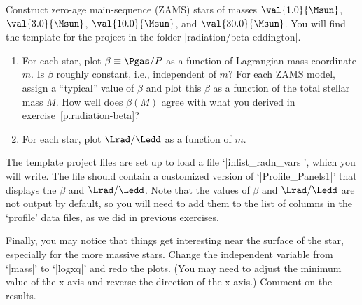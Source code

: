
\DefineShortVerb{\|}

\begin{mesaproject}
\label{m.beta-Eddington}

Construct zero-age main-sequence (ZAMS) stars of masses $\val{1.0}{\Msun}$, $\val{3.0}{\Msun}$, $\val{10.0}{\Msun}$, and $\val{30.0}{\Msun}$. You will find the template for the project in  the folder |radiation/beta-eddington|. 

\begin{enumerate}
\item For each star, plot $\beta\equiv \Pgas/P$ as a function of Lagrangian mass coordinate $m$. Is $\beta$ roughly constant, i.e., independent of $m$? For each ZAMS model, assign a ``typical'' value of $\beta$ and plot this $\beta$ as a function of the total stellar mass $M$.  How well does $\beta(M)$ agree with what you derived in exercise~\ref{p.radiation-beta}?

\item For each star, plot $\Lrad/\Ledd$ as a function of $m$.
\end{enumerate}
The template project files are set up to load a file `|inlist_radn_vars|', which you will write.  The file should contain a customized version of `|Profile_Panels1|' that displays the $\beta$ and $\Lrad/\Ledd$. Note that the values of $\beta$ and $\Lrad/\Ledd$ are not output by default, so you will need to add them to the list of columns in the `profile' data files, as we did in previous exercises.

Finally, you may notice that things get interesting near the surface of the star, especially for the more massive stars.  Change the independent variable from `|mass|' to `|logxq|' and redo the plots. (You may need to adjust the minimum value of the x-axis and reverse the direction of the x-axis.) Comment on the results.
\end{mesaproject}
\UndefineShortVerb{\|}
